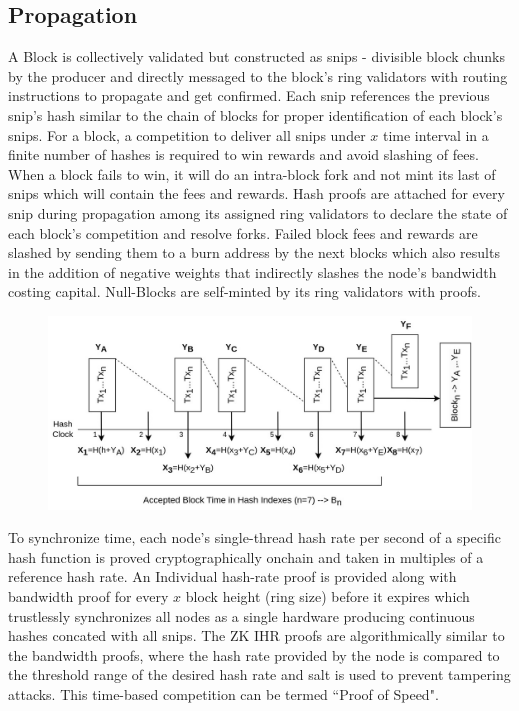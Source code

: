 \documentclass[a4paper,	10pt]{extarticle}
\begin{document}
\subsection{Propagation}
A Block is collectively validated but constructed as snips - divisible block chunks by the producer and directly messaged to the block's ring validators with routing instructions to propagate and get confirmed. Each snip references the previous snip's hash similar to the chain of blocks for proper identification of each block's snips. For a block, a competition to deliver all snips under $x$ time interval in a finite number of hashes is required to win rewards and avoid slashing of fees. When a block fails to win, it will do an intra-block fork and not mint its last of snips which will contain the fees and rewards. Hash proofs are attached for every snip during propagation among its assigned ring validators to declare the state of each block's competition and resolve forks. Failed block fees and rewards are slashed by sending them to a burn address by the next blocks which also results in the addition of negative weights that indirectly slashes the node's bandwidth costing capital. Null-Blocks are self-minted by its ring validators with proofs.\\
\begin{figure}[H]
\begin{center}
\includegraphics[width=12cm]{Snips}
\end{center}
\end{figure}
To synchronize time, each node's single-thread hash rate per second of a specific hash function is proved cryptographically onchain and taken in multiples of a reference hash rate. An Individual hash-rate proof is provided along with bandwidth proof for every $x$ block height (ring size) before it expires which trustlessly synchronizes all nodes as a single hardware producing continuous hashes concated with all snips. The ZK IHR proofs are algorithmically similar to the bandwidth proofs, where the hash rate provided by the node is compared to the threshold range of the desired hash rate and salt is used to prevent tampering attacks. This time-based competition can be termed ``Proof of Speed".
\end{document}

